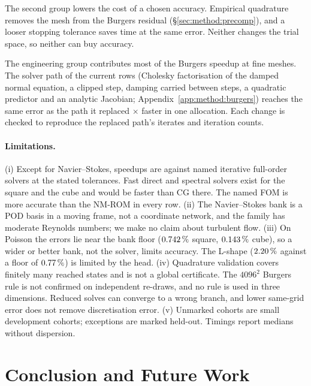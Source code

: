 \documentclass{article}
\begin{document}
The second group lowers the cost of a chosen accuracy. Empirical
quadrature removes the mesh from the Burgers residual
(\S\ref{sec:method:precomp}), and a looser stopping tolerance saves time
at the same error. Neither changes the trial space, so neither can buy
accuracy.

The engineering group contributes most of the Burgers speedup at fine
meshes. The solver path of the current rows (Cholesky factorisation of
the damped normal equation, a clipped step, damping carried between
steps, a quadratic predictor and an analytic Jacobian;
Appendix~\ref{app:method:burgers}) reaches the same error as the path it
replaced $\times$ faster in one allocation. Each change
is checked to reproduce the replaced path's iterates and iteration
counts.

\paragraph{Limitations.}\label{sec:limitations}
\label{sec:results:head}\label{sec:results:collapse}\label{sec:exp:eq}
(i) Except for Navier--Stokes, speedups are against named iterative
full-order solvers at the stated tolerances. Fast direct and spectral
solvers exist for the square and the cube and would be faster than CG
there. The named FOM is more accurate than the NM-ROM in every row.
(ii) The Navier--Stokes bank is a POD basis in a moving frame, not a
coordinate network, and the family has moderate Reynolds numbers; we make
no claim about turbulent flow.
(iii) On Poisson the errors lie near the bank floor
($0.742\,\%$ square, $0.143\,\%$ cube), so a wider
or better bank, not the solver, limits accuracy. The L-shape
($2.20\,\%$ against a floor of $0.77\,\%$) is
limited by the head.
(iv) Quadrature validation covers finitely many reached states and is not
a global certificate. The $4096^2$ Burgers rule is not confirmed on
independent re-draws, and no rule is used in three dimensions. Reduced
solves can converge to a wrong branch, and lower same-grid error does not
remove discretisation error.
(v) Unmarked cohorts are small development cohorts; exceptions are marked
held-out. Timings report medians without dispersion.

\section{Conclusion and Future Work}\label{sec:conclusion}
\end{document}
